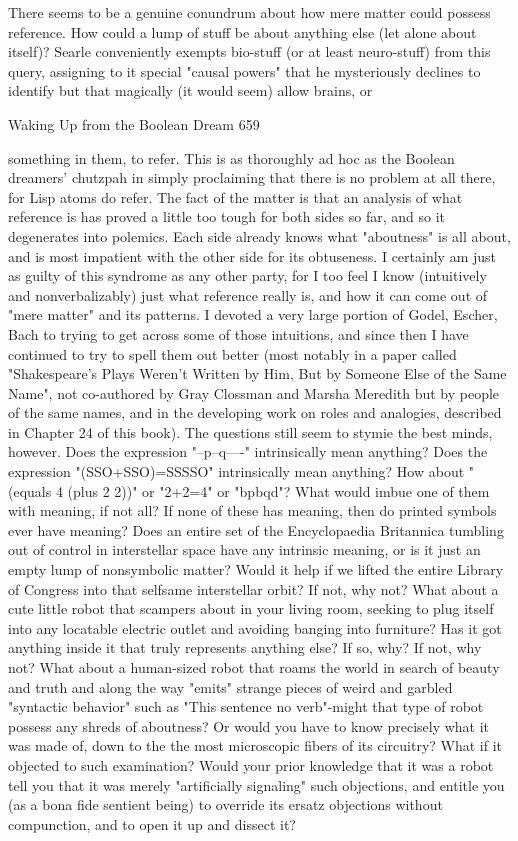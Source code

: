        There seems to be a genuine conundrum about how mere matter could possess
reference. How could a lump of stuff be about anything else (let alone about itself)?
Searle conveniently exempts bio-stuff (or at least neuro-stuff) from this query,
assigning to it special "causal powers" that he mysteriously declines to identify but
that magically (it would seem) allow brains, or




Waking Up from the Boolean Dream                                                     659

something in them, to refer. This is as thoroughly ad hoc as the Boolean dreamers'
chutzpah in simply proclaiming that there is no problem at all there, for Lisp atoms do
refer. The fact of the matter is that an analysis of what reference is has proved a little
too tough for both sides so far, and so it degenerates into polemics. Each side already
knows what "aboutness" is all about, and is most impatient with the other side for its
obtuseness. I certainly am just as guilty of this syndrome as any other party, for I too
feel I know (intuitively and nonverbalizably) just what reference really is, and how it
can come out of "mere matter" and its patterns. I devoted a very large portion of
Godel, Escher, Bach to trying to get across some of those intuitions, and since then I
have continued to try to spell them out better (most notably in a paper called
"Shakespeare's Plays Weren't Written by Him, But by Someone Else of the Same
Name", not co-authored by Gray Clossman and Marsha Meredith but by people of the
same names, and in the developing work on roles and analogies, described in Chapter
24 of this book). The questions still seem to stymie the best minds, however.
         Does the expression "--p--q----" intrinsically mean anything? Does the
expression "(SSO+SSO)=SSSSO" intrinsically mean anything? How about "(equals 4
(plus 2 2))" or "2+2=4" or "bpbqd"? What would imbue one of them with meaning, if
not all? If none of these has meaning, then do printed symbols ever have meaning?
Does an entire set of the Encyclopaedia Britannica tumbling out of control in
interstellar space have any intrinsic meaning, or is it just an empty lump of
nonsymbolic matter? Would it help if we lifted the entire Library of Congress into
that selfsame interstellar orbit? If not, why not?
         What about a cute little robot that scampers about in your living room, seeking
to plug itself into any locatable electric outlet and avoiding banging into furniture?
Has it got anything inside it that truly represents anything else? If so, why? If not,
why not? What about a human-sized robot that roams the world in search of beauty
and truth and along the way "emits" strange pieces of weird and garbled "syntactic
behavior" such as "This sentence no verb"-might that type of robot possess any shreds
of aboutness? Or would you have to know precisely what it was made of, down to the
the most microscopic fibers of its circuitry? What if it objected to such examination?
Would your prior knowledge that it was a robot tell you that it was merely "artificially
signaling" such objections, and entitle you (as a bona fide sentient being) to override
its ersatz objections without compunction, and to open it up and dissect it?

